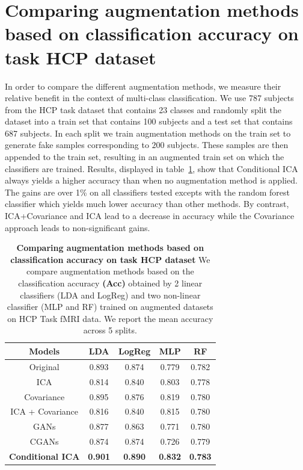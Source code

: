 \section{Comparing augmentation methods based on classification accuracy on task
  HCP dataset}
In order to compare the different augmentation methods, we measure their 
relative benefit in the context of multi-class classification.
We use 787 subjects from the HCP task dataset that contains 23 classes and
randomly split the dataset into a train set that contains 100 subjects and a test set
that contains 687 subjects. In each split we train augmentation methods on the
train set to generate fake samples corresponding to $200$ subjects.  
These samples are then appended to the train set, resulting in an
augmented train set on which the classifiers are trained. Results, displayed in
table~\ref{condica:tab3}, show that Conditional ICA always yields a higher accuracy
than when no augmentation method is applied. The gains are over 1\% on all
classifiers tested excepts with the random forest classifier which yields much
lower accuracy than other methods.
%
By contrast, ICA+Covariance and ICA lead to a decrease in accuracy
while the Covariance approach leads to non-significant
gains.
%

\begin{table}
  \setlength{\tabcolsep}{0.23em}
  \begin{center}
    \begin{tabular}{c|c|c|c | c}
      \hline
      Models & LDA & LogReg & MLP& RF\\
      \hline
      Original           & 0.893 & 0.874 &  0.779 &0.782 \\
    ICA                & 0.814 & 0.840 &  0.803 &0.778\\
    Covariance         & 0.895 & 0.876 &  0.819 &0.780\\
    ICA + Covariance   & 0.816 & 0.840 &  0.815 &0.780\\
    GANs               & 0.877 & 0.863 &  0.771 &0.780\\
    CGANs              & 0.874 & 0.874 &   0.726&0.779 \\
    \hline                                      
      \textbf{Conditional ICA} &  \textbf{0.901} & \textbf{0.890} & \textbf{0.832} &  \textbf{0.783} \\
    \hline\hline
\end{tabular}
\end{center}
\caption{\textbf{Comparing augmentation methods based on classification accuracy on task
      HCP dataset} We compare augmentation methods based on the classification
    accuracy \textbf{(Acc)} obtained by 2 linear classifiers (LDA and LogReg) and two
    non-linear classifier (MLP and RF) trained on augmented datasets on HCP
    Task fMRI data. We report the mean accuracy across 5 splits.}
  \label{condica:tab3}
\end{table}

